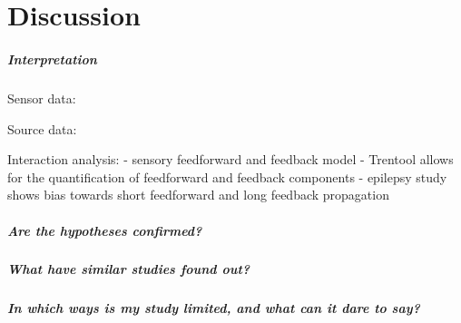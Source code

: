 \chapter{Discussion}

\paragraph{Interpretation}
Sensor data:

Source data:

Interaction analysis:
- sensory feedforward and feedback model
- Trentool allows for the quantification of feedforward and feedback components
- epilepsy study shows bias towards short feedforward and long feedback propagation

\paragraph{Are the hypotheses confirmed?}

\paragraph{What have similar studies found out?}

\paragraph{In which ways is my study limited, and what can it dare to say?}